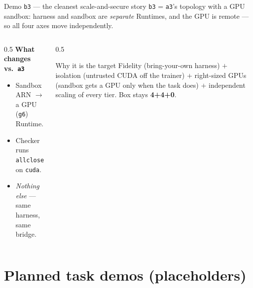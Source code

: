 \documentclass[aspectratio=169]{beamer}
\begin{document}
\begin{frame}{Demo \texttt{b3} --- the cleanest scale-and-secure story}
  \footnotesize \texttt{b3} = \texttt{a3}'s topology with a GPU sandbox: harness and sandbox are
  \emph{separate} Runtimes, and the GPU is remote --- so all four axes move independently.
  \begin{columns}[T]
    \begin{column}{0.5\textwidth}
      \textbf{What changes vs.\ \texttt{a3}}
      \begin{itemize}\setlength\itemsep{0.1em}
        \item Sandbox ARN $\to$ a GPU (\texttt{g6}) Runtime.
        \item Checker runs \texttt{allclose} on \texttt{cuda}.
        \item \emph{Nothing else} --- same harness, same bridge.
      \end{itemize}
    \end{column}
    \begin{column}{0.5\textwidth}
      \begin{block}{Why it is the target}
        \scriptsize Fidelity (bring-your-own harness) $+$ isolation (untrusted CUDA off the trainer)
        $+$ right-sized GPUs (sandbox gets a GPU only when the task does) $+$ independent scaling of
        every tier. Box stays \textbf{4+4+0}.
      \end{block}
    \end{column}
  \end{columns}
\end{frame}

\section{Planned task demos (placeholders)}
\end{document}

